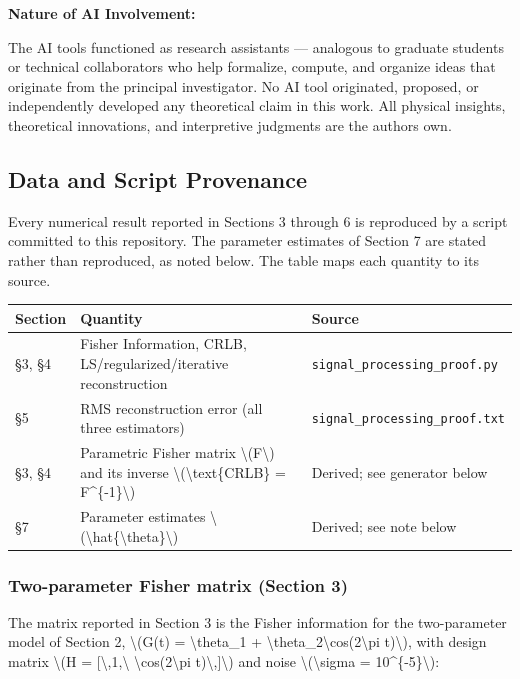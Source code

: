 \documentclass[
  10pt,
]{article}
\begin{document}
\textbf{Nature of AI Involvement:}

The AI tools functioned as research assistants --- analogous to graduate
students or technical collaborators who help formalize, compute, and
organize ideas that originate from the principal investigator. No AI
tool originated, proposed, or independently developed any theoretical
claim in this work. All physical insights, theoretical innovations, and
interpretive judgments are the author\textquotesingle s own.

\hypertarget{data-and-script-provenance}{%
\subsection{Data and Script
Provenance}\label{data-and-script-provenance}}

Every numerical result reported in Sections 3 through 6 is reproduced by
a script committed to this repository. The parameter estimates of
Section 7 are stated rather than reproduced, as noted below. The table
maps each quantity to its source.

\begin{longtable}[]{@{}lll@{}}
\toprule\noalign{}
Section & Quantity & Source \\
\midrule\noalign{}
\endhead
\bottomrule\noalign{}
\endlastfoot
§3, §4 & Fisher Information, CRLB, LS/regularized/iterative
reconstruction & \texttt{signal\_processing\_proof.py} \\
§5 & RMS reconstruction error (all three estimators) &
\texttt{signal\_processing\_proof.txt} \\
§3, §4 & Parametric Fisher matrix \textbackslash(F\textbackslash) and
its inverse \textbackslash(\textbackslash text\{CRLB\} =
F\^{}\{-1\}\textbackslash) & Derived; see generator below \\
§7 & Parameter estimates
\textbackslash(\textbackslash hat\{\textbackslash theta\}\textbackslash)
& Derived; see note below \\
\end{longtable}

\hypertarget{two-parameter-fisher-matrix-section-3}{%
\subsubsection{Two-parameter Fisher matrix (Section
3)}\label{two-parameter-fisher-matrix-section-3}}

The matrix reported in Section 3 is the Fisher information for the
two-parameter model of Section 2, \textbackslash(G(t) =
\textbackslash theta\_1 +
\textbackslash theta\_2\textbackslash cos(2\textbackslash pi
t)\textbackslash), with design matrix \textbackslash(H =
{[}\textbackslash,1,\textbackslash{}
\textbackslash cos(2\textbackslash pi
t)\textbackslash,{]}\textbackslash) and noise
\textbackslash(\textbackslash sigma = 10\^{}\{-5\}\textbackslash):
\end{document}
